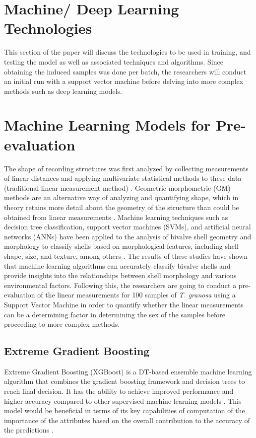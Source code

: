 \section{Machine/ Deep Learning Technologies}
This section of the paper will discuss the technologies to be used in training, and testing the model as well as associated techniques and algorithms.  Since obtaining the induced samples was done per batch, the researchers will conduct an initial run with a support vector machine before delving into more complex methods such as deep learning models. 

\section{Machine Learning Models for Pre-evaluation }
\label{sec:ml models}

The shape of recording structures was first analyzed by collecting measurements of linear distances and applying multivariate statistical methods to these data (traditional linear measurement method) \cite{rohlf1984}. Geometric morphometric (GM) methods are an alternative way of analyzing and quantifying shape, which in theory retains more detail about the geometry of the structure than could be obtained from linear measurements \cite{adams2004}. Machine learning techniques such as decision tree classification, support vector machines (SVMs), and artificial neural networks (ANNs) have been applied to the analysis of bivalve shell geometry and morphology to classify shells based on morphological features, including shell shape, size, and texture, among others \cite{kiel2021}. The results of these studies have shown that machine learning algorithms can accurately classify bivalve shells and provide insights into the relationships between shell morphology and various environmental factors.
Following this, the researchers are going to conduct a pre-evaluation of the linear measurements for 100 samples of \textit{T. granosa} using a Support Vector Machine in order to quantify whether the linear measurements can be a determining factor in determining the sex of the samples before proceeding to more complex methods. 

\subsection{Extreme Gradient Boosting}
Extreme Gradient Boosting (XGBoost) is a DT-based ensemble machine learning algorithm that combines the gradient boosting framework and decision trees to reach final decision. It has the ability to achieve improved performance and higher accuracy compared to other supervised machine learning models . This model would be beneficial in terms of its key capabilities of computation of the importance of the attributes based on the overall contribution to the accuracy of the predictions \cite{torres2023}. 

